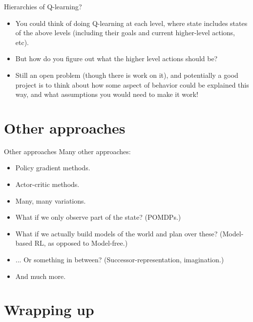 \documentclass{beamer} %
\begin{document}
\begin{frame}{Hierarchies of Q-learning?} 
\begin{itemize}
\item You could think of doing Q-learning at each level, where state includes states of the above levels (including their goals and current higher-level actions, etc).
\item<2-> But how do you figure out what the higher level actions should be?
\item<3-> Still an open problem (though there is work on it), and potentially a good project is to think about how some aspect of behavior could be explained this way, and what assumptions you would need to make it work!

\end{itemize}
\end{frame}


\section{Other approaches}

\begin{frame}{Other approaches}
Many other approaches:
\begin{itemize}
    \item<1-> Policy gradient methods.
    \item<2-> Actor-critic methods.
    \item<3-> Many, many variations.
\end{itemize}
\begin{itemize}
    \item<5-> What if we only observe part of the state? (POMDPs.) 
    \item<6-> What if we actually build models of the world and plan over these? (Model-based RL, as opposed to Model-free.) 
    \item<7-> ... Or something in between? (Successor-representation, imagination.)
    \item<8-> And much more.
\end{itemize}
\end{frame}

\section{Wrapping up}
\end{document}
